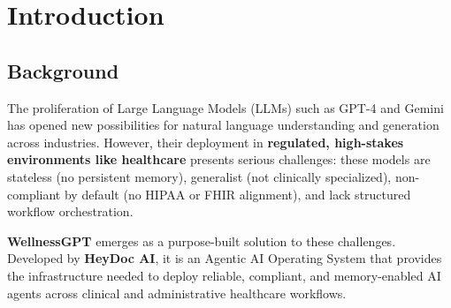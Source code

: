 \documentclass[12pt,a4paper]{article}
\begin{document}
\begin{abstract}
\noindent
This Technical System Essay (TSE) provides a comprehensive analysis of \textbf{WellnessGPT}, an Agentic Artificial Intelligence Operating System developed by HeyDoc AI (HeyDoc Healthtech Pvt. Ltd.) for the healthcare industry. The document examines the platform's three-pillar architecture — Specialized Healthcare AI Agents, Agentic Orchestration Engine, and HealthMem Temporal Memory — along with its system flow, underlying technology stack, compliance framework, integration capabilities, and competitive positioning. WellnessGPT represents a significant departure from generic large language model (LLM) deployments by offering domain-specific agents with longitudinal patient memory, multi-agent orchestration, and regulatory compliance aligned with HIPAA, FHIR, and India's ABDM ecosystem.
\end{abstract}

\newpage

\section{Introduction}

\subsection{Background}

The proliferation of Large Language Models (LLMs) such as GPT-4 and Gemini has opened new possibilities for natural language understanding and generation across industries. However, their deployment in \textbf{regulated, high-stakes environments like healthcare} presents serious challenges: these models are stateless (no persistent memory), generalist (not clinically specialized), non-compliant by default (no HIPAA or FHIR alignment), and lack structured workflow orchestration.

\textbf{WellnessGPT} emerges as a purpose-built solution to these challenges. Developed by \textbf{HeyDoc AI}, it is an Agentic AI Operating System that provides the infrastructure needed to deploy reliable, compliant, and memory-enabled AI agents across clinical and administrative healthcare workflows.
\end{document}
